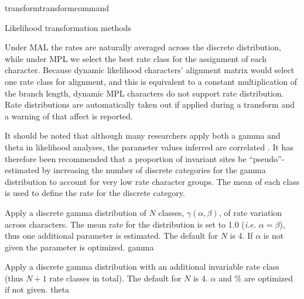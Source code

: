 \begin{command}{transform}{transformcommand}
\begin{arguments}
\begin{argumentgroup}{Likelihood transformation methods}
{                \begin{statement}
                    Under MAL the rates are naturally averaged across the
                    discrete distribution, while under MPL we select the best
                    rate class for the assignment of each character. Because
                    dynamic likelihood characters' alignment matrix would select
                    one rate class for alignment, and this is equivalent to a
                    constant multiplication of the branch length, dynamic MPL
                    characters do not support rate distribution. Rate distributions are
                    automatically taken out if applied during a transform and a
                    warning of that affect is reported.
                \end{statement}

                \begin{statement}
                    It should be noted that although many researchers apply both
                    a gamma and theta in likelihood analyses, the parameter
                    values inferred are correlated \cite{sullivan1999}.  It has
                    therefore been recommended that a proportion of invariant
                    sites be ``pseudo''-estimated by increasing the number of
                    discrete categories for the gamma distribution to account
                    for very low rate character groups. The mean of each class
                    is used to define the rate for the discrete category.
                \end{statement}

                \begin{description}

                        {Apply a discrete gamma distribution of $N$ classes,
                        $\gamma(\alpha,\beta)$, of rate variation across
                        characters. The mean rate for the distribution is set to
                        1.0 (\emph{i.e.} $\alpha = \beta$), thus one additional parameter is
                        estimated. The default for $N$ is 4. If $\alpha$ is
                        not given the parameter is optimized.}
                        {gamma}

                        {Apply a discrete gamma distribution with an additional
                        invariable rate class (thus $N+1$ rate classes in total).
                        The default for $N$ is 4. $\alpha$ and \% are optimized if
                        not given.}
                        {theta}


\end{description}}
\end{argumentgroup}
\end{arguments}
\end{command}
